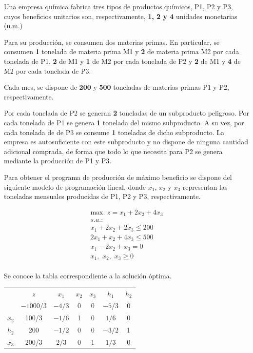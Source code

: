 Una empresa química fabrica tres tipos de productos químicos, P1, P2 y P3, cuyos beneficios unitarios son, respectivamente, \textbf{1, 2 y 4} unidades monetarias (u.m.) 

Para su producción, se consumen dos materias primas. En particular, se consumen \textbf{1} tonelada de materia prima M1 y \textbf{2} de materia prima M2 por cada tonelada de P1, \textbf{2} de M1 y \textbf{1} de M2 por cada tonelada de P2 y \textbf{2} de M1 y \textbf{4} de M2 por cada tonelada de P3.

Cada mes, se dispone de \textbf{200} y \textbf{500} toneladas de materias primas P1 y P2, respectivamente. 

Por cada tonelada de P2 se generan \textbf{2} toneladas de un subproducto peligroso. Por cada tonelada de P1 se genera \textbf{1} tonelada del mismo subproducto. A su vez, por cada tonelada de de P3 se consume \textbf{1} toneladas de dicho subproducto. La empresa es autosuficiente con este subproducto y no dispone de ninguna cantidad adicional comprada, de forma que todo lo que necesita para P2 se genera mediante la producción de P1 y P3.

Para obtener el programa de producción de máximo beneficio se dispone del siguiente modelo de programación lineal, donde $x_1$, $x_2$ y $x_3$ representan las toneladas mensuales producidas de P1, P2 y P3, respectivamente.
 
\begin{equation}
\begin{split}
\mbox{max. } z = x_1 + 2x_2 + 4x_3\\
s.a.:\\
 x_1 + 2x_2 + 2x_3 \leq 200\\
2x_1 +  x_2 + 4x_3 \leq 500\\
 x_1 - 2x_2 +  x_3 = 0\\
x_1,\,\,x_2,\,\,x_3\geq 0\\
\end{split}
\end{equation}

Se conoce la tabla correspondiente a la solución óptima.

\begin{center}
\begin{tabular}{c|c|ccccc|}
 & $z$ & $x_1$ & $x_2$ & $x_3$ & $h_1$ & $h_2$\\ 
      & $-1000/3$ & $-4/3$ & 0 & 0 & $-5/3$ & 0 \\ 
\hline
$x_2$ & 100/3  & $-1/6$ & 1 & 0 & $1/6$ & 0\\ 
$h_2$ & 200  & $-1/2$ & 0 & 0 & $-3/2$ & 1\\ 
$x_3$ & 200/3  & $2/3$ & 0 & 1 & $1/3$ & 0\\ 
\hline
\end{tabular}
\end{center}





